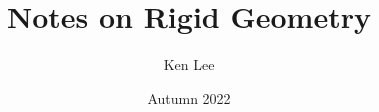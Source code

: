 \documentclass{article}
\begin{document}
\title{Notes on Rigid Geometry}

\author{Ken Lee}
\date{Autumn 2022}
\maketitle


\end{document}
